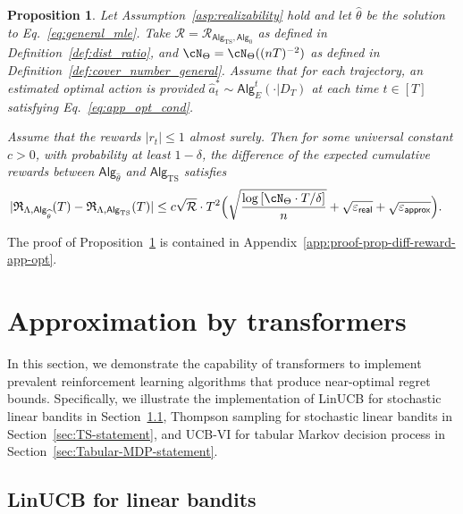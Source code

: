 \documentclass[10pt]{article}
\newtheorem{proposition}[theorem]{Proposition}
\renewcommand{\epsilon}{\varepsilon}
\newcommand{\eps}{\varepsilon}
\newcommand{\<}{\left\langle}
\renewcommand{\>}{\right\rangle}
\newcommand{\brac}[1]{{\left[ #1 \right]}}
\newcommand{\TS}{{\mathrm{TS}}}
\newcommand{\action}{{a}}
\newcommand{\reward}{{r}}
\newcommand{\totlen}{{T}}
\newcommand{\sAlg}{{\mathsf{Alg}}}
\newcommand{\dset}{{D}}
\newcommand{\Numobs}{{n}}
\newcommand{\Parspace}{{\Theta}}
\newcommand{\appeps}{\eps_{{\mathsf{approx}}}}
\newcommand{\EstPar}{{\widehat{\theta}}}
\newcommand{\prior}{{\Lambda}}
\newcommand{\shortexp}{{E}}
\newcommand{\geneps}{{\epsilon}_{\sf real}}
\newcommand{\totreward}{{\mathfrak{R}}}
\newcommand{\distratio}{{\mathcal{R}}}
\begin{document}
\begin{proposition}\label{prop:app_opt_diff_reward} Let Assumption~\ref{asp:realizability} hold and let $\EstPar$ be the solution to Eq.~\eqref{eq:general_mle}. Take $\distratio = \distratio_{\sAlg_\TS,\sAlg_0}$ as defined in Definition~\ref{def:dist_ratio}, and $\cN_{\Parspace} = \cN_{\Parspace}((\Numobs\totlen)^{-2})$  as defined in Definition~\ref{def:cover_number_general}. Assume that for each trajectory, an estimated optimal action is provided $\widehat\action_t^* \sim \sAlg_{\shortexp}^t(\cdot | \dset_\totlen)$ at each time $t\in[\totlen]$ satisfying Eq.~\eqref{eq:app_opt_cond}. 







Assume that the rewards $|\reward_t|\leq 1$  almost surely. Then for some universal constant $c>0$, with probability at least $1-\delta$, the difference of the expected cumulative rewards between $\sAlg_\EstPar$ and $\sAlg_\TS$ satisfies 
\begin{align*}
|\totreward_{\prior,\sAlg_\EstPar}(\totlen)-\totreward_{\prior,\sAlg_\TS}(\totlen)|
&\leq 
c \sqrt{\distratio}\cdot\totlen^2 \Big( \sqrt{\frac{\log \brac{ \cN_{\Parspace} \cdot \totlen/\delta } }{n} } + \sqrt{\geneps} + \sqrt{\appeps} \Big). 
\end{align*}
\end{proposition}
The proof of Proposition~\ref{prop:app_opt_diff_reward} is contained in Appendix~\ref{app:proof-prop-diff-reward-app-opt}. 







\section{Approximation by transformers}\label{sec:ICRL}

In this section, we demonstrate the capability of transformers to implement prevalent reinforcement learning algorithms that produce near-optimal regret bounds. Specifically, we illustrate the implementation of LinUCB for stochastic linear bandits in Section~\ref{sec:LinUCB-statement}, Thompson sampling for stochastic linear bandits in Section~\ref{sec:TS-statement}, and UCB-VI for tabular Markov decision process in Section~\ref{sec:Tabular-MDP-statement}. 

\subsection{LinUCB for linear bandits}\label{sec:LinUCB-statement}
\end{document}
